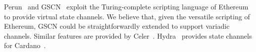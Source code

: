 %

  Perun~\cite{perun} and GSCN~\cite{DBLP:conf/ccs/DziembowskiFH18} exploit the
  Turing-complete scripting language of Ethereum to provide virtual state
  channels.
  We believe that, given the versatile scripting of Ethereum, GSCN could be
  straightforwardly extended to support variadic channels. Similar
  features are provided by Celer~\cite{dong2018celer}.
  Hydra~\cite{cryptoeprint:2020:299} provides state channels for
  Cardano~\cite{cardano}.



